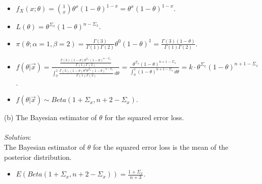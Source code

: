 \documentclass[12pt]{article}
\newcommand{\ds}{\displaystyle}
\begin{document}
\begin{itemize}
    \item $ \ds f_X(x ; \theta) = \binom{1}{x} \theta^{x} (1 - \theta)^{1 - x} = \theta^{x} (1 - \theta)^{1 - x} $. \\
    \item $ \ds L(\theta) = \theta^{\Sigma_{x}} (1 - \theta)^{n - \Sigma_{x}} $. \\
    \item $ \ds \pi(\theta ; \alpha = 1, \beta = 2) = \frac{\Gamma(3)}{\Gamma(1)\Gamma(2)} \theta^{0} (1 - \theta)^{1} =
    \frac{\Gamma(3)(1 - \theta)}{\Gamma(1)\Gamma(2)} $. \\
    \item $ \ds f(\theta | \overrightarrow{x}) = \frac{ \ds \frac{ \Gamma(3)(1 - \theta) \theta^{\Sigma_{x}} (1 - \theta)^{n - \Sigma_{x} } }{\Gamma(1)\Gamma(2)}}{ \ds \int_{0}^{1}\frac{ \Gamma(3)(1 - \theta) \theta^{x} \theta^{\Sigma_{x}} (1 - \theta)^{n - \Sigma_{x}} }{ \Gamma(1)\Gamma(2)} \, d\theta } =
    \frac{ \theta^{\Sigma_{x}} (1 - \theta)^{n + 1 - \Sigma_{x}} }{ \ds \int_{0}^{1} (1 - \theta)^{n + 1 - \Sigma_{x}} \, d\theta} = k \cdot \theta^{\Sigma_{x}} (1 - \theta)^{n + 1 - \Sigma_{x}} $. \\
    \item $ \ds f(\theta | \overrightarrow{x}) \sim Beta(1 + \Sigma_{x}, n + 2 - \Sigma_{x}) $. \\
\end{itemize}

\vspace{2.5mm}

\newpage

(b) The Bayesian estimator of $ \theta $ for the squared error loss. \\
\vspace{2.5mm} \\
\textit{Solution}:
\vspace{2.5mm} \\

\noindent
The Bayesian estimator of $ \theta $ for the squared error loss is the mean of the posterior distribution. \\

\begin{itemize}
    \item $ \ds E ( Beta(1 + \Sigma_{x}, n + 2 - \Sigma_{x}) ) = \frac{1 + \Sigma_{x}}{n + 3}$.
\end{itemize}
\end{document}
